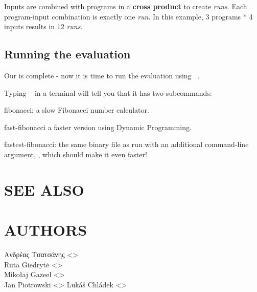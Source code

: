 \documentclass[a4paper,english]{article}
\begin{document}
\begin{adjustwidth}{18pt}{0pt}
    Inputs are combined with programs in a \textbf{cross product} to create
    \emph{runs}. Each program-input combination is exactly one \emph{run}.
    In this example, 3 programs * 4 inputs results in 12 \emph{runs}.

    \subsection{Running the evaluation}

    Our  is complete - now it is time to run the evaluation
    using ~.

    Typing ~ in a terminal will tell you that it has two
    subcommands:


    \begin{Description}[subcommands]\setlength{\itemsep}{0cm}
    \item[fibonacci:] a slow Fibonacci number calculator.
    \item[fast-fibonacci] a faster version using Dynamic Programming.
    \item[fastest-fibonacci:] the same binary file as  run
      with an additional command-line argument, , which should make it
      even faster!
    \end{Description}


    \section{SEE ALSO}



    \section{AUTHORS}
    Ανδρέας Τσατσάνης <>\\[0.1cm]\MANbr
    Rūta Giedrytė <>\\[0.1cm]\MANbr
    Mikołaj Gazeel <>\\[0.1cm]\MANbr
    Jan Piotrowski <>
    Lukáš Chládek <>\\[0.1cm]\MANbr
\end{adjustwidth}
\end{document}
